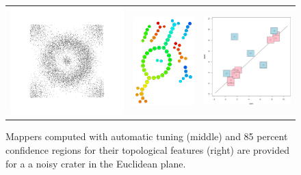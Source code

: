 \begin{figure}
\begin{tabular}{ccc}
\includegraphics[width=6.5cm]{figures/crater} &\includegraphics[width=3.5cm]{figures/craterDTM_10_40_mappercoord0_subs100_g40.pdf} & \includegraphics[width=5cm]{figures/craterDTM_10_40_conf85_boot100.pdf} \\
\end{tabular}
\caption[Automatic Mappers on a noisy dataset]{\label{fig:noisy} Mappers computed with automatic tuning (middle) and 85 percent confidence regions for their topological features (right) are provided for
a a noisy crater in the Euclidean plane. }
\end{figure}

























